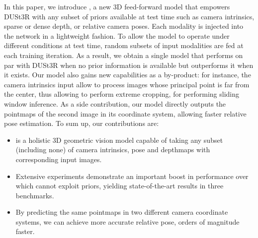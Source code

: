 In this paper, we introduce \ours{}, a new 3D feed-forward model that empowers DUSt3R with any subset of priors available at test time such as camera intrinsics, sparse or dense depth, or relative camera poses.
Each modality is injected into the network in a lightweight fashion. To allow the model to operate under different conditions at test time, random subsets of input modalities are fed at each training iteration.  
As a result, we obtain a single model that performs on par with DUSt3R when no prior information is available but outperforms it when it exists.
Our model also gains new capabilities as a by-product: for instance, the camera intrinsics input allow to process images whose principal point is far from the center, thus allowing to perform extreme cropping, \eg for performing sliding window inference. As a side contribution, our model directly outputs the pointmaps of the second image in its coordinate system, allowing faster relative pose estimation. To sum up, our contributions are:
\begin{itemize}
    \item \ours{} is a holistic 3D geometric vision model capable of taking any subset (including none) of camera intrinsics, pose and depthmaps with corresponding input images.
    \item Extensive experiments demonstrate an important boost in performance over \duster{} which cannot exploit priors, yielding state-of-the-art results in three benchmarks. %
    \item By predicting the same pointmaps in two different camera coordinate systems, we can achieve more accurate relative pose, orders of magnitude faster.
\end{itemize}






    







    





